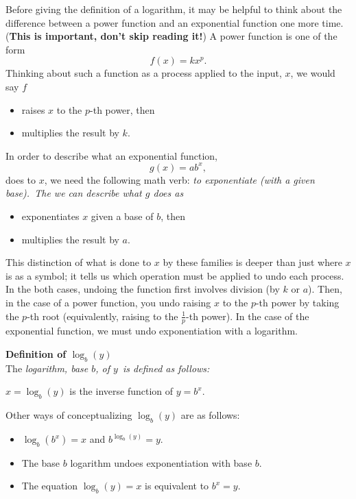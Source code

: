 \begin{eg}
\par

Before giving the definition of a logarithm, it may be helpful to think about the difference between a power function and an exponential function one more time. ({\bf This is important, don't skip reading it!}) A power function is one of the form
\[
f(x) = kx^p.
\]
Thinking about such a function as a process applied to the input, $x$, we would say $f$
\begin{itemize}
\item raises $x$ to the $p$-th power, then
\item multiplies the result by $k$.
\end{itemize} 
In order to describe what an exponential function, 
\[
g(x) = ab^x,
\]
does to $x$, we need the following math verb: \it{to exponentiate (with a given base)}.\ \normalfont The we can describe what $g$ does as
\begin{itemize}
\item exponentiates $x$ given a base of $b$, then
\item multiplies the result by $a$.
\end{itemize}
This distinction of what is done to $x$ by these families is deeper than just where $x$ is as a symbol; it tells us which operation must be applied to undo each process. In the both cases, undoing the function first involves division (by $k$ or $a$). Then, in the case of a power function, you undo raising $x$ to the $p$-th power by taking the $p$-th root (equivalently, raising to the $\frac{1}{p}$-th power). In the case of the exponential function, we must undo exponentiation with a logarithm.


\begin{tcolorbox}
{\bf Definition of $\log_{b}(y)$}\\
The \it{logarithm, base $b$, of $y$}\ \normalfont is defined as follows:
\begin{center}
$x = \log_b(y)$ is the inverse function of $y = b^{x}$.
\end{center}
Other ways of conceptualizing $\log_{b}(y)$ are as follows:
\begin{itemize}
\item $\log_{b}(b^x)=x$ and $b^{\log_{b}(y)} = y$.
\item The base $b$ logarithm undoes exponentiation with base $b$.
\item The equation $\log_b(y) = x$ is equivalent to $b^{x} = y$.  
\end{itemize} 
\end{tcolorbox}



\end{eg}
